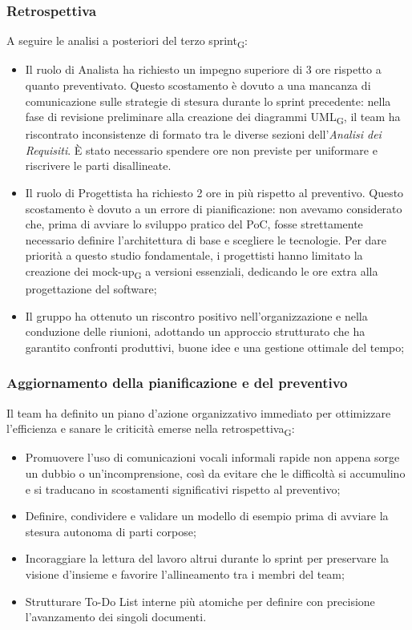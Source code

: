 \documentclass[a4paper, 10pt, colorlinks=true, linkcolor=black, urlcolor=blue, citecolor=blue, hidelinks]{article}
\begin{document}
\subsubsection{Retrospettiva}
A seguire le analisi a posteriori del terzo sprint\textsubscript{G}:
\begin{itemize}
    \item Il ruolo di Analista ha richiesto un impegno superiore di 3 ore rispetto a quanto preventivato. Questo scostamento è dovuto a una mancanza di comunicazione sulle strategie di stesura durante lo sprint precedente: nella fase di revisione preliminare alla creazione dei diagrammi UML\textsubscript{G}, il team ha riscontrato inconsistenze di formato tra le diverse sezioni dell'\textit{Analisi dei Requisiti}. È stato necessario spendere ore non previste per uniformare e riscrivere le parti disallineate.
    \item Il ruolo di Progettista ha richiesto 2 ore in più rispetto al preventivo. Questo scostamento è dovuto a un errore di pianificazione: non avevamo considerato che, prima di avviare lo sviluppo pratico del PoC, fosse strettamente necessario definire l'architettura di base e scegliere le tecnologie. Per dare priorità a questo studio fondamentale, i progettisti hanno limitato la creazione dei mock-up\textsubscript{G} a versioni essenziali, dedicando le ore extra alla progettazione del software;   
    \item Il gruppo ha ottenuto un riscontro positivo nell'organizzazione e nella conduzione delle riunioni, adottando un approccio strutturato che ha garantito confronti produttivi, buone idee e una gestione ottimale del tempo;
\end{itemize}

\subsubsection{Aggiornamento della pianificazione e del preventivo}
Il team ha definito un piano d'azione organizzativo immediato per ottimizzare l'efficienza e sanare le criticità emerse nella retrospettiva\textsubscript{G}:
\begin{itemize}
    \item Promuovere l'uso di comunicazioni vocali informali rapide non appena sorge un dubbio o un'incomprensione, così da evitare che le difficoltà si accumulino e si traducano in scostamenti significativi rispetto al preventivo;
    \item Definire, condividere e validare un modello di esempio prima di avviare la stesura autonoma di parti corpose;
    \item Incoraggiare la lettura del lavoro altrui durante lo sprint per preservare la visione d'insieme e favorire l'allineamento tra i membri del team;
    \item Strutturare To-Do List interne più atomiche per definire con precisione l'avanzamento dei singoli documenti.
\end{itemize}
\end{document}
